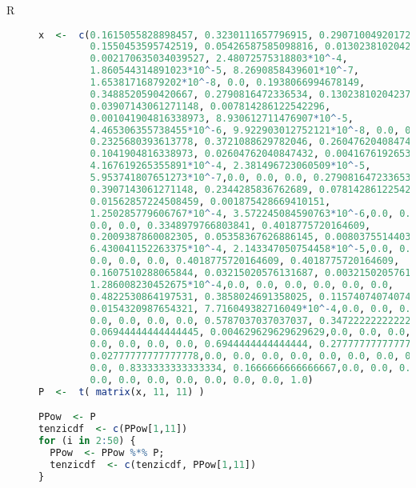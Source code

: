 
\begin{description}



\item[R] 


  \begin{lstlisting}[language=R]
x  <-  c(0.1615055828898457, 0.3230111657796915, 0.2907100492017223,
         0.1550453595742519, 0.05426587585098816, 0.01302381020423716,
         0.002170635034039527, 2.48072575318803*10^-4,
         1.860544314891023*10^-5, 8.2690858439601*10^-7,
         1.65381716879202*10^-8, 0.0, 0.1938066994678149,
         0.3488520590420667, 0.2790816472336534, 0.1302381020423716,
         0.03907143061271148, 0.007814286122542296,
         0.001041904816338973, 8.930612711476907*10^-5,
         4.465306355738455*10^-6, 9.922903012752121*10^-8, 0.0, 0.0,
         0.2325680393613778, 0.3721088629782046, 0.2604762040847432,
         0.1041904816338973, 0.02604762040847432, 0.004167619265355891,
         4.167619265355891*10^-4, 2.381496723060509*10^-5,
         5.953741807651273*10^-7,0.0, 0.0, 0.0, 0.2790816472336534,
         0.3907143061271148, 0.2344285836762689, 0.07814286122542295,
         0.01562857224508459, 0.001875428669410151,
         1.250285779606767*10^-4, 3.572245084590763*10^-6,0.0, 0.0,
         0.0, 0.0, 0.3348979766803841, 0.4018775720164609,
         0.2009387860082305, 0.05358367626886145, 0.008037551440329218,
         6.430041152263375*10^-4, 2.143347050754458*10^-5,0.0, 0.0,
         0.0, 0.0, 0.0, 0.4018775720164609, 0.4018775720164609,
         0.1607510288065844, 0.03215020576131687, 0.003215020576131687,
         1.286008230452675*10^-4,0.0, 0.0, 0.0, 0.0, 0.0, 0.0,
         0.4822530864197531, 0.3858024691358025, 0.1157407407407407,
         0.0154320987654321, 7.716049382716049*10^-4,0.0, 0.0, 0.0,
         0.0, 0.0, 0.0, 0.0, 0.5787037037037037, 0.3472222222222222,
         0.06944444444444445, 0.004629629629629629,0.0, 0.0, 0.0, 0.0,
         0.0, 0.0, 0.0, 0.0, 0.6944444444444444, 0.2777777777777778,
         0.02777777777777778,0.0, 0.0, 0.0, 0.0, 0.0, 0.0, 0.0, 0.0,
         0.0, 0.8333333333333334, 0.1666666666666667,0.0, 0.0, 0.0,
         0.0, 0.0, 0.0, 0.0, 0.0, 0.0, 0.0, 1.0)
P  <-  t( matrix(x, 11, 11) )

PPow  <- P
tenzicdf  <- c(PPow[1,11])
for (i in 2:50) {
  PPow  <- PPow %*% P;
  tenzicdf  <- c(tenzicdf, PPow[1,11])
}


\end{lstlisting}
\end{description}
